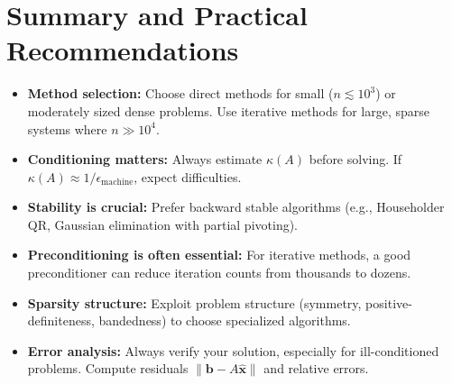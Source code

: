\section{Summary and Practical Recommendations}

\begin{itemize}
    \item \textbf{Method selection:} Choose direct methods for small ($n \lesssim 10^3$) or moderately sized dense problems. Use iterative methods for large, sparse systems where $n \gg 10^4$.
    \item \textbf{Conditioning matters:} Always estimate $\kappa(A)$ before solving. If $\kappa(A) \approx 1/\epsilon_{\text{machine}}$, expect difficulties.
    \item \textbf{Stability is crucial:} Prefer backward stable algorithms (e.g., Householder QR, Gaussian elimination with partial pivoting).
    \item \textbf{Preconditioning is often essential:} For iterative methods, a good preconditioner can reduce iteration counts from thousands to dozens.
    \item \textbf{Sparsity structure:} Exploit problem structure (symmetry, positive-definiteness, bandedness) to choose specialized algorithms.
    \item \textbf{Error analysis:} Always verify your solution, especially for ill-conditioned problems. Compute residuals $\|\mathbf{b} - A\hat{\mathbf{x}}\|$ and relative errors.
\end{itemize}

